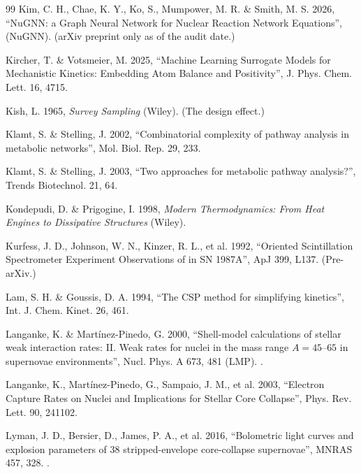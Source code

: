 \begin{thebibliography}{99}
Kim, C. H., Chae, K. Y., Ko, S., Mumpower, M. R. \& Smith, M. S. 2026,
``NuGNN: a Graph Neural Network for Nuclear Reaction Network Equations'',
 (NuGNN). (arXiv preprint only as of the audit date.)

Kircher, T. \& Votsmeier, M. 2025, ``Machine Learning Surrogate Models for
Mechanistic Kinetics: Embedding Atom Balance and Positivity'', J. Phys. Chem.
Lett. 16, 4715.

Kish, L. 1965, \emph{Survey Sampling} (Wiley). (The design effect.)

Klamt, S. \& Stelling, J. 2002, ``Combinatorial complexity of pathway analysis
in metabolic networks'', Mol. Biol. Rep. 29, 233.

Klamt, S. \& Stelling, J. 2003, ``Two approaches for metabolic pathway
analysis?'', Trends Biotechnol. 21, 64.

Kondepudi, D. \& Prigogine, I. 1998, \emph{Modern Thermodynamics: From Heat
Engines to Dissipative Structures} (Wiley).

Kurfess, J. D., Johnson, W. N., Kinzer, R. L., et al. 1992, ``Oriented
Scintillation Spectrometer Experiment Observations of  in
SN 1987A'', ApJ 399, L137. (Pre-arXiv.)

Lam, S. H. \& Goussis, D. A. 1994, ``The CSP method for simplifying kinetics'',
Int. J. Chem. Kinet. 26, 461.

Langanke, K. \& Mart\'inez-Pinedo, G. 2000, ``Shell-model calculations of
stellar weak interaction rates: II. Weak rates for nuclei in the mass range
$A = 45$--$65$ in supernovae environments'', Nucl. Phys. A 673, 481 (LMP).
.

Langanke, K., Mart\'inez-Pinedo, G., Sampaio, J. M., et al. 2003, ``Electron
Capture Rates on Nuclei and Implications for Stellar Core Collapse'', Phys.
Rev. Lett. 90, 241102.

Lyman, J. D., Bersier, D., James, P. A., et al. 2016, ``Bolometric light curves
and explosion parameters of 38 stripped-envelope core-collapse supernovae'',
MNRAS 457, 328. .


\end{thebibliography}
